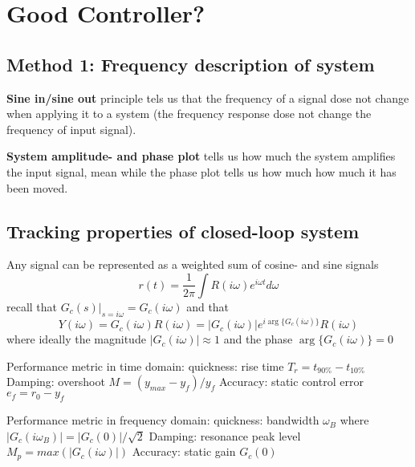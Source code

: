 \documentclass{article}
\begin{document}

\section{Good Controller?}
\subsection{Method 1: Frequency description of system}
\textbf{Sine in/sine out} principle tels us that the frequency of a signal dose not 
change when applying it to a system (the frequency response dose not change the 
frequency of input signal).

\textbf{System amplitude- and phase plot} tells us how much the system amplifies the 
input signal, mean while the phase plot tells us how much how much it has been moved.

\subsection{Tracking properties of closed-loop system}
Any signal can be represented as a weighted sum of cosine- and sine signals
\begin{equation*}
    r(t) = \frac{1}{2\pi} \int R(i\omega)e^{i\omega t}d\omega
\end{equation*}
recall that $G_c(s)|_{s=i\omega} = G_c(i\omega)$ and that
\begin{equation*}
    Y(i\omega) = G_c(i\omega)R(i\omega) = |G_c(i\omega)|e^{i \arg\{G_c(i\omega)\}}R(i\omega)
\end{equation*}
where ideally the magnitude $|G_c(i\omega)| \approx 1$ and the phase $\arg\{ G_c(i\omega) \} = 0$

Performance metric in time domain:
quickness: rise time $T_r = t_{90\%} - t_{10\%}$
Damping: overshoot $M = (y_{max}- y_f)/y_f$
Accuracy: static control error $e_f = r_0 - y_f$

Performance metric in frequency domain:
quickness: bandwidth $\omega_B$ where $|G_c(i\omega_B)| = |G_c(0)|/\sqrt{2}$
Damping: resonance peak level $M_p = max(|G_c(i\omega)|)$
Accuracy: static gain $G_c(0)$
\end{document}
